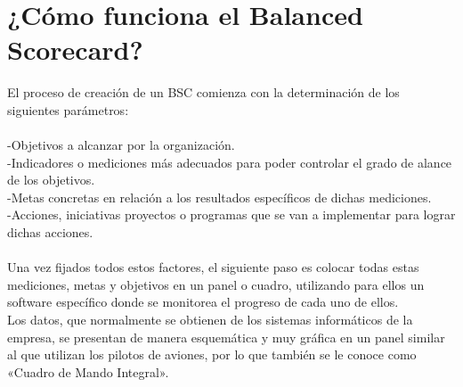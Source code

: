 \section{¿Cómo funciona el Balanced Scorecard?}
\item{El proceso de creación de un BSC comienza con la determinación de los siguientes parámetros:\\\\
-Objetivos a alcanzar por la organización.\\
-Indicadores o mediciones más adecuados para poder controlar el grado de alance de los objetivos.\\
-Metas concretas en relación a los resultados específicos de dichas mediciones.\\
-Acciones, iniciativas proyectos o programas que se van a implementar para lograr dichas acciones.\\\\
Una vez fijados todos estos factores, el siguiente paso es colocar todas estas mediciones, metas y objetivos en un panel o cuadro, utilizando para ellos un software específico donde se monitorea el progreso de cada uno de ellos.\\
Los datos, que normalmente se obtienen de los sistemas informáticos de la empresa, se presentan de manera esquemática y muy gráfica en un panel similar al que utilizan los pilotos de aviones, por lo que también se le conoce como «Cuadro de Mando Integral».}

